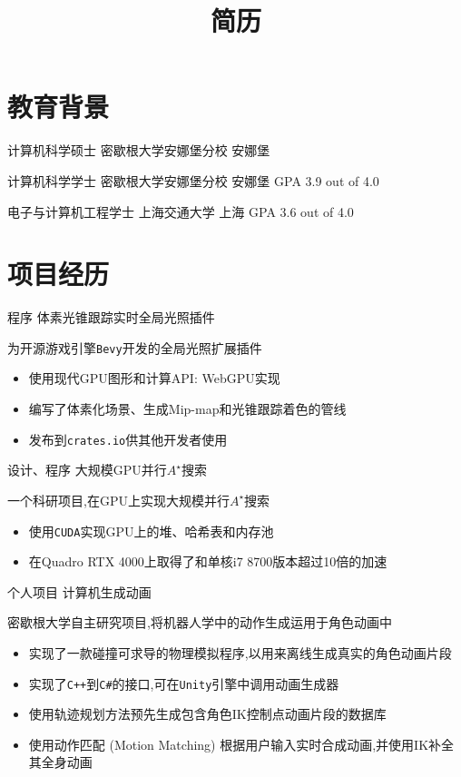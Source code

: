 \documentclass[10pt, a4paper, sans]{moderncv}
\title{简历}
\begin{document}
\makecvtitle

\section{教育背景}
{计算机科学硕士}
{密歇根大学安娜堡分校}
{安娜堡}
{}
{}

{计算机科学学士}
{密歇根大学安娜堡分校}
{安娜堡}
{GPA 3.9 out of 4.0}
{}

{电子与计算机工程学士}
{上海交通大学}
{上海}
{GPA 3.6 out of 4.0}
{}

\section{项目经历}
{程序}
{体素光锥跟踪实时全局光照插件}{}{}
{
	为开源游戏引擎\texttt{Bevy}开发的全局光照扩展插件
	\begin{itemize}
		\item 使用现代GPU图形和计算API: WebGPU实现
		\item 编写了体素化场景、生成Mip-map和光锥跟踪着色的管线
		\item 发布到\texttt{crates.io}供其他开发者使用
	\end{itemize}
}

{设计、程序}
{大规模GPU并行$A^\star$搜索}{}{}
{
	一个科研项目,在GPU上实现大规模并行$A^\star$搜索
	\begin{itemize}
		\item 使用\texttt{CUDA}实现GPU上的堆、哈希表和内存池
		\item 在Quadro RTX 4000上取得了和单核i7 8700版本超过10倍的加速
	\end{itemize}
}
{个人项目}
{计算机生成动画}
{}{}
{密歇根大学自主研究项目,将机器人学中的动作生成运用于角色动画中
	\begin{itemize}
		\item 实现了一款碰撞可求导的物理模拟程序,以用来离线生成真实的角色动画片段
		\item 实现了\texttt{C++}到\texttt{C\#}的接口,可在\texttt{Unity}引擎中调用动画生成器
		\item 使用轨迹规划方法预先生成包含角色IK控制点动画片段的数据库
		\item 使用动作匹配 (Motion Matching) 根据用户输入实时合成动画,并使用IK补全其全身动画
	\end{itemize}
}
\end{document}
